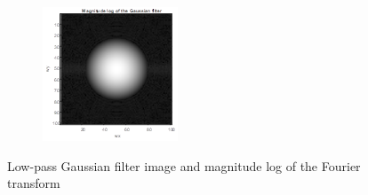 \begin{figure}
\begin{subfigure}{0.4\textwidth}
        \includegraphics[width=\textwidth]{Resources/F11-b.png}
        \caption{}
        \label{fig:Second}
    \end{subfigure}
    \caption{Low-pass Gaussian filter image and magnitude log of the Fourier transform}
    \label{fig:ApplyingFilters}
\end{figure}